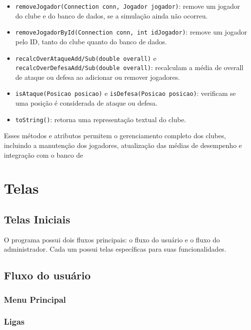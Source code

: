 \documentclass[12pt]{article}
\begin{document}
\begin{itemize}
\begin{itemize}
          \item \texttt{removeJogador(Connection conn, Jogador jogador)}: remove um jogador do clube e do banco de dados, se a simulação ainda não ocorreu.
          \item \texttt{removeJogadorById(Connection conn, int idJogador)}: remove um jogador pelo ID, tanto do clube quanto do banco de dados.
          \item \texttt{recalcOverAtaqueAdd/Sub(double overall)} e \texttt{recalcOverDefesaAdd/Sub(double overall)}: recalculam a média de overall de ataque ou defesa ao adicionar ou remover jogadores.
          \item \texttt{isAtaque(Posicao posicao)} e \texttt{isDefesa(Posicao posicao)}: verificam se uma posição é considerada de ataque ou defesa.
          \item \texttt{toString()}: retorna uma representação textual do clube.
        \end{itemize}
\end{itemize}

Esses métodos e atributos permitem o gerenciamento completo dos clubes, incluindo a manutenção dos jogadores, atualização das médias de desempenho e integração com o banco de



\section{Telas}
\label{sec:telas}

\subsection{Telas Iniciais}
\label{sec:telas_iniciais}

O programa possui dois fluxos principais: o fluxo do usuário e o fluxo do administrador. Cada um possui telas específicas para suas funcionalidades.

\subsection{Fluxo do usuário}
\label{sec:fluxo_usuario}
\subsubsection{Menu Principal}
\label{sec:menu_principal}
\subsubsection{Ligas}
\label{sec:ligasUsr}
\end{document}
